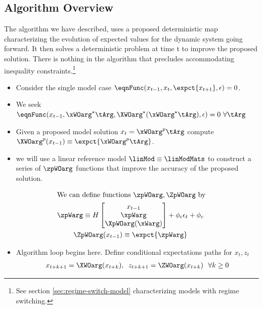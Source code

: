 \documentclass[12pt]{article}
\begin{document}
\subsection{Algorithm Overview}

 \label{sec:unknown-solutions}
The algorithm we have described,
uses a proposed deterministic map
characterizing the evolution of expected values for
the dynamic system going forward. It then solves
a deterministic problem at time t to improve the proposed solution.
There is nothing in the algorithm that precludes accommodating  inequality
constraints.\footnote{See section \ref{sec:regime-switch-model} characterizing
  models with regime switching.}


{
  \begin{itemize}
  \item Consider the single model case $  \eqnFunc(x_{t-1},x_t,\expct{x_{t+1}},\epsilon)=0$.  
\item We seek $\eqnFunc(x_{t-1},\xWOarg^\star\tArg,\XWOarg^\star(\xWOarg^\star\tArg),\epsilon)=0\,\,\forall \tArg $
\item Given a proposed model solution $x_t=\xWOarg^p\tArg$ compute $\XWOarg^p(x_{t-1})\equiv \expct{\xWOarg^p\tArg}$. 
\item we will use a linear reference model $\linMod  \equiv \linModMats$ 
to construct a series of $\zpWOarg$ functions that improve the accuracy of the proposed solution.
\end{itemize}
}



\begin{gather*}
 \intertext{We can define functions $\zpWOarg,\ZpWOarg$ by}
\zpWarg\equiv H
\begin{bmatrix}
x_{t-1}\\ \xpWarg\\ \XpWOarg(\xWarg)
\end{bmatrix}+\phi_\epsilon \epsilon_t+\phi_c\\
\ZpWOarg(x_{t-1})\equiv \expct{\zpWarg}
\end{gather*}
 \begin{itemize}
\item  {\color{blue}Algorithm loop begins here.} Define conditional expectations paths for $x_t, z_t$ 
 \begin{gather*}
 x_{t+k+1}=\XWOarg(x_{t+k}),\,\,\,z_{t+k+1}=\ZWOarg(x_{t+k})\,\,\,\,  \forall k\ge 0      \end{gather*}
   \end{itemize}
\end{document}
